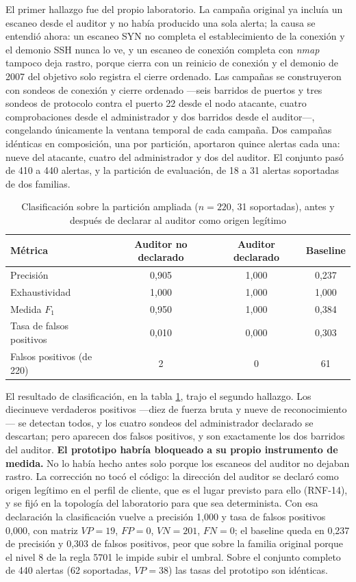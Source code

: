 El primer hallazgo fue del propio laboratorio. La campaña original ya incluía un escaneo desde el
auditor y no había producido una sola alerta; la causa se entendió ahora: un escaneo SYN no
completa el establecimiento de la conexión y el demonio SSH nunca lo ve, y un escaneo de conexión
completa con \emph{nmap} tampoco deja rastro, porque cierra con un reinicio de conexión y el
demonio de 2007 del objetivo solo registra el cierre ordenado. Las campañas se construyeron con
sondeos de conexión y cierre ordenado ---seis barridos de puertos y tres sondeos de protocolo
contra el puerto 22 desde el nodo atacante, cuatro comprobaciones desde el administrador y dos barridos desde
el auditor---, congelando únicamente la ventana temporal de cada campaña. Dos campañas idénticas en
composición, una por partición, aportaron quince alertas cada una: nueve del atacante, cuatro del
administrador y dos del auditor. El conjunto pasó de 410 a 440 alertas, y la partición de
evaluación, de 18 a 31 alertas soportadas de dos familias.

\begin{table}[H]
  \centering
  \caption{Clasificación sobre la partición ampliada ($n=220$, 31 soportadas), antes y después de
  declarar al auditor como origen legítimo}
  \label{tab:segunda-familia}
  \begin{tabular}{@{}lccc@{}}
    \toprule
    \textbf{Métrica} & \textbf{Auditor no declarado} & \textbf{Auditor declarado} & \textbf{Baseline} \\
    \midrule
    Precisión & 0,905 & 1,000 & 0,237 \\
    Exhaustividad & 1,000 & 1,000 & 1,000 \\
    Medida $F_1$ & 0,950 & 1,000 & 0,384 \\
    Tasa de falsos positivos & 0,010 & 0,000 & 0,303 \\
    Falsos positivos (de 220) & 2 & 0 & 61 \\
    \bottomrule
  \end{tabular}
\end{table}

El resultado de clasificación, en la tabla \ref{tab:segunda-familia}, trajo el segundo hallazgo. Los
diecinueve verdaderos positivos ---diez de fuerza bruta y nueve de reconocimiento--- se detectan
todos, y los cuatro sondeos del administrador declarado se descartan; pero aparecen dos falsos
positivos, y son exactamente los dos barridos del auditor. \textbf{El prototipo habría bloqueado a
su propio instrumento de medida.} No lo había hecho antes solo porque los escaneos del auditor no
dejaban rastro. La corrección no tocó el código: la dirección del auditor se declaró como origen
legítimo en el perfil de cliente, que es el lugar previsto para ello (RNF-14), y se fijó en la
topología del laboratorio para que sea determinista. Con esa declaración la clasificación vuelve a
precisión 1,000 y tasa de falsos positivos 0,000, con matriz $VP=19$, $FP=0$, $VN=201$, $FN=0$; el
baseline queda en 0,237 de precisión y 0,303 de falsos positivos, peor que sobre la familia
original porque el nivel 8 de la regla 5701 le impide subir el umbral. Sobre el conjunto completo
de 440 alertas (62 soportadas, $VP=38$) las tasas del prototipo son idénticas.


